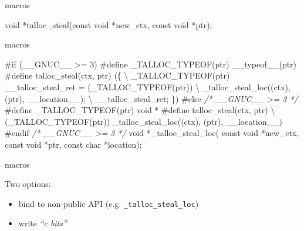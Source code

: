 \documentclass[ignorenonframetext,aspectratio=169]{beamer}
\newenvironment{Shaded}{}{}
\newcommand{\DataTypeTok}[1]{\textcolor[rgb]{0.56,0.13,0.00}{{#1}}}
\newcommand{\CommentTok}[1]{\textcolor[rgb]{0.38,0.63,0.69}{\textit{{#1}}}}
\newcommand{\PreprocessorTok}[1]{\textcolor[rgb]{0.74,0.48,0.00}{{#1}}}
\newcommand{\NormalTok}[1]{{#1}}
\providecommand{\tightlist}{%
  \setlength{\itemsep}{0pt}\setlength{\parskip}{0pt}}
\begin{document}
\begin{frame}[fragile]{macros}

\begin{Shaded}
\begin{Highlighting}[]
\DataTypeTok{void} \NormalTok{*talloc_steal(}\DataTypeTok{const} \DataTypeTok{void} \NormalTok{*new_ctx, }\DataTypeTok{const} \DataTypeTok{void} \NormalTok{*ptr);}
\end{Highlighting}
\end{Shaded}

\end{frame}

\begin{frame}[fragile]{macros}

\begin{Shaded}
\begin{Highlighting}[]
\PreprocessorTok{#if (__GNUC__ >= 3)}
\PreprocessorTok{#define _TALLOC_TYPEOF(ptr) __typeof__(ptr)}
\PreprocessorTok{#define talloc_steal(ctx, ptr) (\{ \textbackslash{}}
\PreprocessorTok{  _TALLOC_TYPEOF(ptr) __talloc_steal_ret = (_TALLOC_TYPEOF(ptr)) \textbackslash{}}
\PreprocessorTok{    _talloc_steal_loc((ctx), (ptr), __location__); \textbackslash{}}
\PreprocessorTok{  __talloc_steal_ret; \})}
\PreprocessorTok{#else }\CommentTok{/* __GNUC__ >= 3 */}
\PreprocessorTok{#define _TALLOC_TYPEOF(ptr) void *}
\PreprocessorTok{#define talloc_steal(ctx, ptr) \textbackslash{}}
\PreprocessorTok{  (_TALLOC_TYPEOF(ptr)) _talloc_steal_loc((ctx), (ptr), __location__)}
\PreprocessorTok{#endif }\CommentTok{/* __GNUC__ >= 3 */}
\DataTypeTok{void} \NormalTok{*_talloc_steal_loc(}
  \DataTypeTok{const} \DataTypeTok{void} \NormalTok{*new_ctx, }\DataTypeTok{const} \DataTypeTok{void} \NormalTok{*ptr, }\DataTypeTok{const} \DataTypeTok{char} \NormalTok{*location);}
\end{Highlighting}
\end{Shaded}

\end{frame}

\begin{frame}[fragile]{macros}

Two options:

\begin{itemize}
\tightlist
\item
  bind to non-public API (e.g. \texttt{\_talloc\_steal\_loc})
\item
  write \emph{``c bits''}
\end{itemize}

\end{frame}
\end{document}
